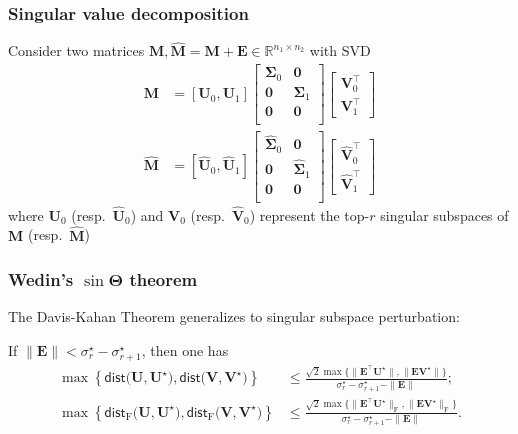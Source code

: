 \documentclass[compress,
mathserif,wide,%
]{beamer}
\begin{document}
\begin{frame}
\frametitle{Singular value decomposition}

	Consider two matrices $\bm{M}, \hat{\bm{M}}=\bm{M}+\bm{E} \in \mathbb{R}^{n_1\times n_2}$ with SVD
%
\begin{align*}
\bm{M} & =\left[\bm{U}_{0},\bm{U}_{1}\right]\left[\begin{array}{cc}
\bm{\Sigma}_{0} & \bm{0}\\
\bm{0} & \bm{\Sigma}_{1} \\
\bm{0} & \bm{0}\\
\end{array}\right]\left[\begin{array}{c}
	\bm{V}_{0}^{\top}\\
	\bm{V}_{1}^{\top}
\end{array}\right]\\
\hat{\bm{M}}  & =\left[ \hat{\bm{U}}_{0}, \hat{\bm{U}}_{1}\right]\left[\begin{array}{cc}
	\hat{\bm{\Sigma}}_{0} & \bm{0}\\
	\bm{0} & \hat{\bm{\Sigma}}_{1}\\
 \bm{0} & \bm{0} \\
\end{array}\right]\left[\begin{array}{c}
	\hat{\bm{V}}_{0}^{\top}\\
	\hat{\bm{V}}_{1}^{\top}
\end{array}\right]
\end{align*}
%
where $\bm{U}_{0}$ (resp.~$\hat{\bm{U}}_{0}$) and $\bm{V}_{0}$ (resp.~$\hat{\bm{V}}_{0}$) represent the top-$r$ singular subspaces of $\bm{M}$ (resp.~$\hat{\bm{M}}$) 

\end{frame}


\begin{frame}
\frametitle{Wedin's $\sin\bm{\Theta}$ theorem}


The Davis-Kahan  Theorem generalizes to singular subspace perturbation:


\begin{theorem}
\label{thm:wedin} If $\|\bm{E}\|<\sigma_{r}^{\star}-\sigma_{r+1}^{\star}$, then one has
%
\begin{align*}
\max\left\{ \mathsf{dist}\big(\bm{U},\bm{U}^{\star}\big),\mathsf{dist}\big(\bm{V},\bm{V}^{\star}\big)\right\}
	& \leq\frac{ \sqrt{2} \max\big\{ \|\bm{E}^{\top}\bm{U}^{\star}\|,\|\bm{E}\bm{V}^{\star}\|\big\} }{\sigma_{r}^{\star}-\sigma_{r+1}^{\star}-\|\bm{E}\|};\\
\max\left\{ \mathsf{dist}_{\mathrm{F}}\big(\bm{U},\bm{U}^{\star}\big),\mathsf{dist}_{\mathrm{F}}\big(\bm{V},\bm{V}^{\star}\big)\right\}
	& \leq\frac{\sqrt{2}\max\big\{ \|\bm{E}^{\top}\bm{U}^{\star}\|_{\mathrm{F}},\|\bm{E}\bm{V}^{\star}\|_{\mathrm{F}}\big\} }{\sigma_{r}^{\star}-\sigma_{r+1}^{\star}-\|\bm{E}\|}.
\end{align*}
%
\end{theorem}


\end{frame}
\end{document}
